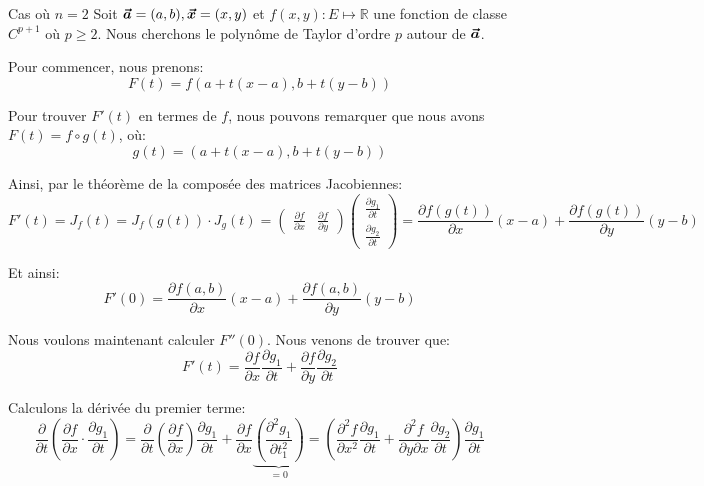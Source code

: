 \documentclass[a4paper]{article}
\begin{document}
\begin{parag}{Cas où $n = 2$}
    Soit $\bvec{a} = \left(a, b\right), \bvec{x} = \left(x, y\right)$ et $f\left(x, y\right): E \mapsto \mathbb{R}$ une fonction de classe $C^{p+1}$ où $p \geq 2$. Nous cherchons le polynôme de Taylor d'ordre $p$ autour de $\bm{\protect\vec{a}}$.

    Pour commencer, nous prenons: 
    \[F\left(t\right) = f\left(a + t\left(x - a\right),  b + t\left(y - b\right)\right)\]

    Pour trouver $F'\left(t\right)$ en termes de $f$, nous pouvons remarquer que nous avons $F\left(t\right) = f \circ g\left(t\right)$, où: 
    \[g\left(t\right) = \left(a + t\left(x - a\right), b + t\left(y - b\right)\right)\]
    
    Ainsi, par le théorème de la composée des matrices Jacobiennes: 
    \[F'\left(t\right) = J_f\left(t\right) = J_f\left(g\left(t\right)\right) \cdot J_g\left(t\right) = \begin{pmatrix} \frac{\partial f}{\partial x} & \frac{\partial f}{\partial y} \end{pmatrix} \begin{pmatrix} \frac{\partial g_1}{\partial t} \\ \frac{\partial g_2}{\partial t} \end{pmatrix} = \frac{\partial f\left(g\left(t\right)\right)}{\partial x}\left(x - a\right) + \frac{\partial f\left(g\left(t\right)\right)}{\partial y}\left(y - b\right)\]
    
    Et ainsi: 
    \[F'\left(0\right) = \frac{\partial f\left(a, b\right)}{\partial x}\left(x - a\right) + \frac{\partial f\left(a, b\right)}{\partial y}\left(y - b\right)\]
    
    Nous voulons maintenant calculer $F''\left(0\right)$. Nous venons de trouver que:
    \[F'\left(t\right) = \frac{\partial f}{\partial x} \frac{\partial g_1}{\partial t} + \frac{\partial f}{\partial y} \frac{\partial g_2}{\partial t} \]
    
    Calculons la dérivée du premier terme:
    \[\frac{\partial }{\partial t}\left(\frac{\partial f}{\partial x} \cdot \frac{\partial g_1}{\partial t}\right) = \frac{\partial }{\partial t} \left(\frac{\partial f}{\partial x}\right) \frac{\partial g_1}{\partial t} + \frac{\partial f}{\partial x} \underbrace{\left(\frac{\partial^2 g_1}{\partial t_1^2}\right)}_{= 0} = \left(\frac{\partial^{2} f}{\partial x^{2}} \frac{\partial g_1}{\partial t} + \frac{\partial^2 f}{\partial y \partial x} \frac{\partial g_2}{\partial t}\right) \frac{\partial g_1}{\partial t}\]


\end{parag}
\end{document}
